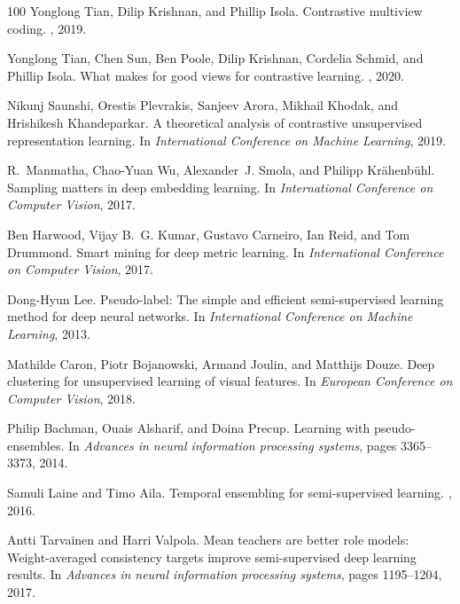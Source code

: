 \documentclass{article}
\begin{document}
{\begin{thebibliography}{100}
Yonglong Tian, Dilip Krishnan, and Phillip Isola.
\newblock Contrastive multiview coding.
, 2019.

Yonglong Tian, Chen Sun, Ben Poole, Dilip Krishnan, Cordelia Schmid, and
  Phillip Isola.
\newblock What makes for good views for contrastive learning.
, 2020.

Nikunj Saunshi, Orestis Plevrakis, Sanjeev Arora, Mikhail Khodak, and
  Hrishikesh Khandeparkar.
\newblock A theoretical analysis of contrastive unsupervised representation
  learning.
\newblock In {\em International Conference on Machine Learning}, 2019.

R.~Manmatha, Chao-Yuan Wu, Alexander~J. Smola, and Philipp Kr{\"a}henb{\"u}hl.
\newblock Sampling matters in deep embedding learning.
\newblock In {\em International Conference on Computer Vision}, 2017.

Ben Harwood, Vijay B.~G. Kumar, Gustavo Carneiro, Ian Reid, and Tom Drummond.
\newblock Smart mining for deep metric learning.
\newblock In {\em International Conference on Computer Vision}, 2017.

Dong-Hyun Lee.
\newblock Pseudo-label: The simple and efficient semi-supervised learning
  method for deep neural networks.
\newblock In {\em International Conference on Machine Learning}, 2013.

Mathilde Caron, Piotr Bojanowski, Armand Joulin, and Matthijs Douze.
\newblock Deep clustering for unsupervised learning of visual features.
\newblock In {\em European Conference on Computer Vision}, 2018.

Philip Bachman, Ouais Alsharif, and Doina Precup.
\newblock Learning with pseudo-ensembles.
\newblock In {\em Advances in neural information processing systems}, pages
  3365--3373, 2014.

Samuli Laine and Timo Aila.
\newblock Temporal ensembling for semi-supervised learning.
, 2016.

Antti Tarvainen and Harri Valpola.
\newblock Mean teachers are better role models: Weight-averaged consistency
  targets improve semi-supervised deep learning results.
\newblock In {\em Advances in neural information processing systems}, pages
  1195--1204, 2017.


\end{thebibliography}}
\end{document}
